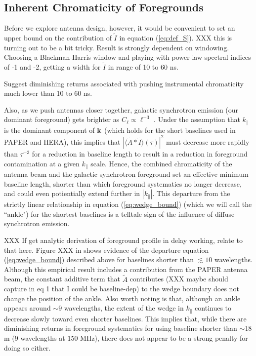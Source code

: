 \documentclass[11pt]{article}
\newcommand{\kvec}{{\bf k}}
\newcommand{\kpl}{{k_\parallel}}
\newcommand{\AI}{{\langle\tilde A*\tilde I\rangle}}
\newcommand{\AItau}{{\AI(\tau)}}
\begin{document}
\subsection{Inherent Chromaticity of Foregrounds}

Before we explore antenna design, however, it would be convenient to set an upper bound on the contribution of
$\tilde I$ in equation (\ref{eq:def_S}).  XXX this is turning out to be a bit tricky.  Result is strongly
dependent on windowing.  Choosing a Blackman-Harris window and playing with power-law spectral indices of
-1 and -2, getting a width for $\tilde I$ in range of 10 to 60 ns.

Suggest diminishing returns associated with pushing instrumental chromaticity much lower than 10 to 60 ns.

Also, as we push antennas closer together, galactic synchrotron emission (our dominant foreground) gets
brighter as $C_\ell\propto\ell^{-3}$ \citep{}.
Under the assumption that $\kpl$ is the dominant component of $\kvec$ (which
holds for the short baselines used in PAPER and HERA),
this implies that $|\AItau|^2$ must decrease more rapidly than $\tau^{-3}$ for a reduction in baseline length
to result in a reduction in foreground contamination at a given $\kpl$ scale.  Hence, the combined chromaticity
of the antenna beam and the galactic synchrotron foreground set an effective minimum baseline length, shorter
than which foreground systematics no longer decrease, and could even potientially extend further in $|\kpl|$.  
This departure from the
strictly linear relationship in equation (\ref{eq:wedge_bound}) (which we will call the ``ankle")
for the shortest baselines is a telltale sign
of the influence of diffuse synchrotron emission.

XXX If get analytic derivation of foreground profile in delay working, relate to that here.
Figure XXX in \citet{pober_et_al2013}
shows evidence of the departure equation (\ref{eq:wedge_bound}) described above for baselines shorter than
$\lesssim10$ wavelengths.  Although this empirical result includes a contribution from the PAPER antenna beam,
the constant additive term that $\tilde A$ contributes (XXX maybe should capture in eq 1 that I could be baseline-dep)
to the wedge boundary does not change the position of the ankle.  Also worth noting is that, although an ankle
appears around $\sim9$ wavelengths, the extent of the wedge in $\kpl$ continues to decrease slowly toward 
even shorter baselines.  This implies that, while there are diminishing returns in foreground systematics for using
baseline shorter than $\sim18$ m (9 wavelengths at 150 MHz), there does not appear to be a strong penalty 
for doing so either.
\end{document}
